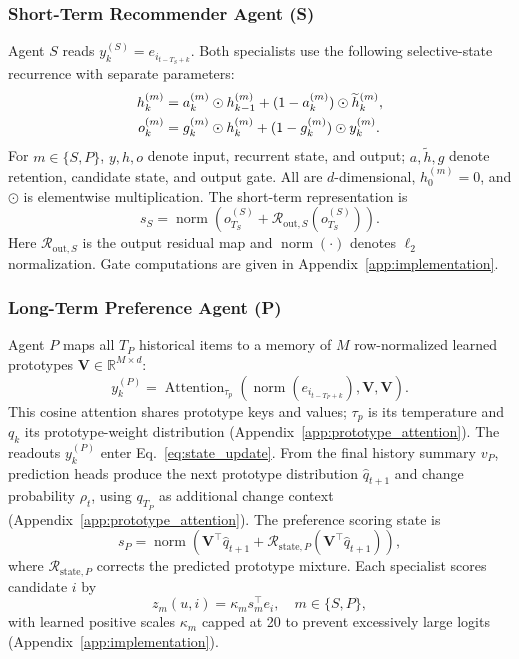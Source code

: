 ﻿\documentclass[sigconf,anonymous,review]{acmart}
\newcommand{\norm}[1]{\operatorname{norm}(#1)}
\begin{document}
\subsubsection{Short-Term Recommender Agent (S)}
Agent $S$ reads $y_k^{(S)}=e_{i_{t-T_S+k}}$. Both specialists use the following selective-state recurrence with separate parameters:
\begin{align}
 h_k^{(m)}&=a_k^{(m)}\odot h_{k-1}^{(m)} +(1-a_k^{(m)})\odot\widetilde h_k^{(m)},\notag\\
 o_k^{(m)}&=g_k^{(m)}\odot h_k^{(m)} +(1-g_k^{(m)})\odot y_k^{(m)}.
 \label{eq:state_update}
\end{align}
For $m\in\{S,P\}$, $y,h,o$ denote input, recurrent state, and output; $a,\widetilde h,g$ denote retention, candidate state, and output gate. All are $d$-dimensional, $h_0^{(m)}=0$, and $\odot$ is elementwise multiplication. The short-term representation is
\begin{equation}
 s_S=\norm{o_{T_S}^{(S)}+\mathcal R_{\mathrm{out},S}(o_{T_S}^{(S)})}.
\end{equation}
Here $\mathcal R_{\mathrm{out},S}$ is the output residual map and $\norm{\cdot}$ denotes $\ell_2$ normalization. Gate computations are given in Appendix~\ref{app:implementation}.

\subsubsection{Long-Term Preference Agent (P)}
Agent $P$ maps all $T_P$ historical items to a memory of $M$ row-normalized learned prototypes $\mathbf V\in\mathbb R^{M\times d}$:
\begin{equation}
 y_k^{(P)}=\operatorname{Attention}_{\tau_p}\!\left(
 \norm{e_{i_{t-T_P+k}}},\mathbf V,\mathbf V\right).
 \label{eq:prototype_attention}
\end{equation}
This cosine attention shares prototype keys and values; $\tau_p$ is its temperature and $q_k$ its prototype-weight distribution (Appendix~\ref{app:prototype_attention}). The readouts $y_k^{(P)}$ enter Eq.~\eqref{eq:state_update}. From the final history summary $v_P$, prediction heads produce the next prototype distribution $\widehat q_{t+1}$ and change probability $\rho_t$, using $q_{T_P}$ as additional change context (Appendix~\ref{app:prototype_attention}). The preference scoring state is
\begin{equation}
 s_P=\norm{\mathbf V^\top\widehat q_{t+1}+\mathcal R_{\mathrm{state},P}(\mathbf V^\top\widehat q_{t+1})},
\end{equation}
where $\mathcal R_{\mathrm{state},P}$ corrects the predicted prototype mixture. Each specialist scores candidate $i$ by
\begin{equation}
 z_m(u,i)=\kappa_m s_m^\top e_i,\quad m\in\{S,P\},
\end{equation}
with learned positive scales $\kappa_m$ capped at 20 to prevent excessively large logits (Appendix~\ref{app:implementation}).
\end{document}
